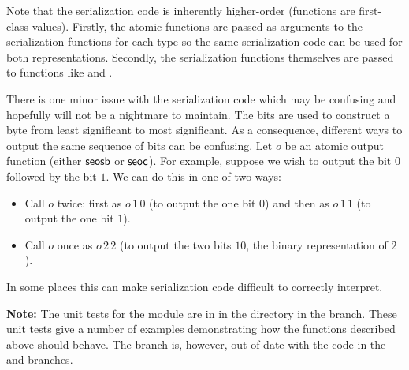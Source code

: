 Note that the serialization code is inherently higher-order (functions are first-class values).
Firstly, the atomic functions are passed as arguments to the serialization functions
for each type so the same serialization code can be used for both representations.
Secondly, the serialization functions themselves are passed to functions like 
and .

There is one minor issue with the serialization code which may be confusing
and hopefully will not be a nightmare to maintain.
The bits are used to construct a byte from least significant to most significant.
As a consequence, different ways to output the same sequence of bits can be confusing.
Let $o$ be an atomic output function (either $\func{seosb}$ or $\func{seoc}$).
For example, suppose we wish to output the bit $0$ followed by the bit $1$.
We can do this in one of two ways:
\begin{itemize}
\item Call $o$ twice: first as $o\,1\,0$ (to output the one bit $0$) and then as $o\,1\,1$ (to output the one bit $1$).
\item Call $o$ once as $o\,2\,2$ (to output the two bits $10$, the binary representation of $2$).
\end{itemize}
In some places this can make serialization code difficult to correctly interpret.

{\bf{Note:}} The unit tests for the {} module are in {}
in the {}
directory in the {} branch.
These unit tests give a number of examples demonstrating how the functions described above should behave.
The {} branch is, however, out of date with the code in the {} and {} branches.
